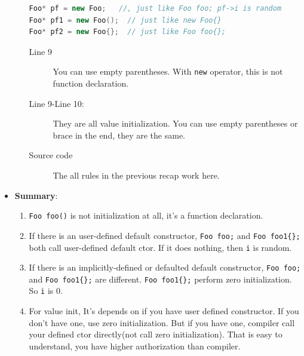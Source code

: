 \documentclass[a4paper,11pt,twoside]{book}
\begin{document}
\begin{itemize}
\begin{enumerate}
\begin{lstlisting}[frame=single, language=c++]
Foo* pf = new Foo;   //, just like Foo foo; pf->i is random 
Foo* pf1 = new Foo();  // just like new Foo{}
Foo* pf2 = new Foo{};  // just like Foo foo{};	
\end{lstlisting}	

\begin{description}			
	\item[Line 9] You can use empty parentheses. With \texttt{new} operator, this is not function declaration. 
	
	\item[Line 9-Line 10:] They are all value initialization. You can use empty parentheses or brace in the end, they are the same. 
	
	\item[Source code] The all rules in the previous recap work here. 
\end{description}		

	\end{enumerate}
		
\item \textbf{Summary}:
\begin{enumerate}
	\item \texttt{Foo foo()} is not initialization at all, it's a function declaration. 
	
	\item If there is an user-defined default constructor, \texttt{Foo foo;} and \texttt{Foo foo1\{\};} both call user-defined default ctor. If it does nothing, then \texttt{i} is random.
	
	\item If there is an implicitly-defined or defaulted default constructor, \texttt{Foo foo;} and \texttt{Foo foo1\{\};} are different. \texttt{Foo foo1\{\};} perform zero initialization. So \texttt{i} is 0. 
	
	\item For value init, It's depends on if you have user defined constructor. If you don't have one, use zero initialization. But if you have one, compiler call your defined ctor directly(not call zero initialization). That is easy to understand, you have higher authorization than compiler. 
\end{enumerate}

\end{itemize}
\end{document}
